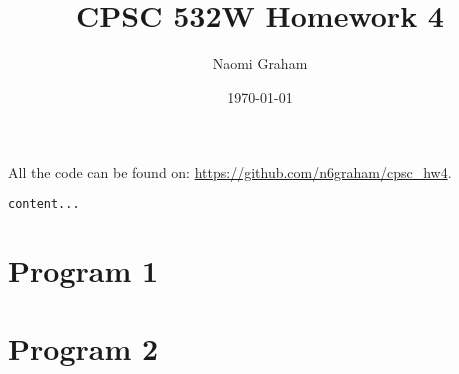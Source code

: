 \documentclass[12pt]{article}%
\theoremstyle{definition}
\begin{document}
	
	\title{CPSC 532W Homework 4}
	\author{Naomi Graham}
	\date{\today}
	\maketitle
	
	All the code can be found on: \url{https://github.com/n6graham/cpsc_hw4}.
	
	
	\begin{lstlisting}[language=Python]
	content...
	\end{lstlisting}

	\section{Program 1}
	
	
	\section{Program 2}
	
	
		
	\newpage
	
	
	
	
%	
%	
	
	
\end{document}

